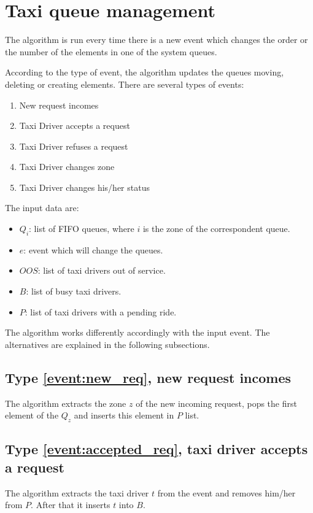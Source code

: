 \section{Taxi queue management}
The algorithm is run every time there is a new event which changes the order or the number of the elements in one of the system queues.

According to the type of event, the algorithm updates the queues moving, deleting or creating elements. There are several types of events:
\begin{enumerate}
	\item New request incomes \label{event:new_req}
	\item Taxi Driver accepts a request \label{event:accepted_req}
	\item Taxi Driver refuses a request \label{event:refuses_req}
	\item Taxi Driver changes zone \label{event:changed_zone}
	\item Taxi Driver changes his/her status \label{event:changed_status}
\end{enumerate}
The input data are:
\begin{itemize}
	\item $Q_i$: list of FIFO queues, where $i$ is the zone of the correspondent queue. 
	\item $e$: event which will change the queues.
	\item $OOS$: list of taxi drivers out of service.
	\item $B$: list of busy taxi drivers.
	\item $P$: list of taxi drivers with a pending ride.
\end{itemize}  

The algorithm works differently accordingly with the input event. The alternatives are explained in the following subsections.

\subsection{Type \ref{event:new_req}, new request incomes}
The algorithm extracts the zone $z$ of the new incoming request, pops the first element of the $Q_z$ and inserts this element in $P$ list.

\subsection{Type \ref{event:accepted_req}, taxi driver accepts a request}
The algorithm extracts the taxi driver $t$ from the event and removes him/her from $P$. After that it inserts $t$ into $B$.

